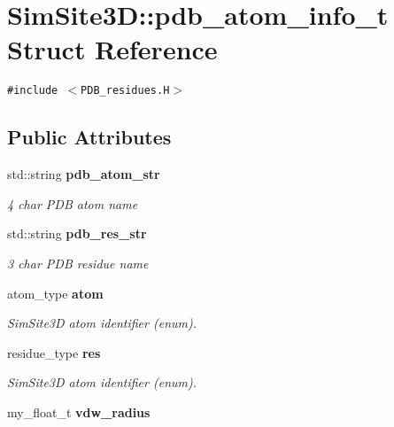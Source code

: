 \section{SimSite3D::pdb\_\-atom\_\-info\_\-t Struct Reference}
\label{structSimSite3D_1_1pdb__atom__info__t}
{\tt \#include $<$PDB\_\-residues.H$>$}

\subsection*{Public Attributes}
\begin{CompactItemize}
\item 
std::string \bf{pdb\_\-atom\_\-str}\label{structSimSite3D_1_1pdb__atom__info__t_5c36c5c8f4e3e90d5cd92dc4aacb5256}

\begin{CompactList}\small\item\em 4 char PDB atom name \item\end{CompactList}\item 
std::string \bf{pdb\_\-res\_\-str}\label{structSimSite3D_1_1pdb__atom__info__t_9b3d5dd5a58707f7df56b34ccd3001dd}

\begin{CompactList}\small\item\em 3 char PDB residue name \item\end{CompactList}\item 
atom\_\-type \bf{atom}\label{structSimSite3D_1_1pdb__atom__info__t_561bfb1b2bef5880d0accf3c7c4563c4}

\begin{CompactList}\small\item\em SimSite3D atom identifier (enum). \item\end{CompactList}\item 
residue\_\-type \bf{res}\label{structSimSite3D_1_1pdb__atom__info__t_85202b305d0450723fd5493b5bbdc1b4}

\begin{CompactList}\small\item\em SimSite3D atom identifier (enum). \item\end{CompactList}\item 
my\_\-float\_\-t \bf{vdw\_\-radius}\label{structSimSite3D_1_1pdb__atom__info__t_0247ef763a73651c46417102552e3c22}


\end{CompactItemize}
